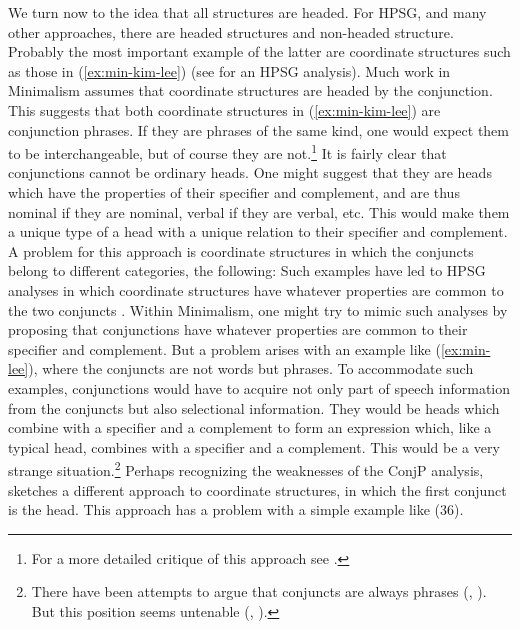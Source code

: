 \documentclass[output=paper]{langsci/langscibook}
\begin{document}
We turn now to the idea that all structures are headed. For HPSG, and many other approaches, there are headed structures and non-headed structure. Probably the most important example of the latter are coordinate structures such as those in (\ref{ex:min-kim-lee}) (see \citealt{Sag.2003} for an HPSG analysis).
\label{ex:min-kim-lee}
\z
Much work in Minimalism assumes that coordinate structures are headed by the conjunction. This suggests that both coordinate structures in (\ref{ex:min-kim-lee}) are conjunction phrases. If they are phrases of the same kind, one would expect them to be interchangeable, but of course they are not.\footnote{%
	For a more detailed critique of this approach see \citet{Borsley2005a}.%
}
\label{ex:min-sang-dance}
\z
It is fairly clear that conjunctions cannot be ordinary heads. One might suggest that they are heads which have the properties of their specifier and complement, and are thus nominal if they are nominal, verbal if they are verbal, etc. This would make them a unique type of a head with a unique relation to their specifier and complement. A problem for this approach is coordinate structures in which the conjuncts belong to different categories, \eg the following:
\eal
{}\label{ex:min-hobbs-linguist}
\label{ex:min-hobbs-angry}
\zl 
Such examples have led to HPSG analyses in which coordinate structures have whatever properties are common to the two conjuncts \citep{Sag.2003}. Within Minimalism, one might try to mimic such analyses by proposing that conjunctions have whatever properties are common to their specifier and complement. But a problem arises with an example like (\ref{ex:min-lee}), where the conjuncts are not words but phrases.
\label{ex:min-kim-criticized}
\z
To accommodate such examples, conjunctions would have to acquire not only part of speech information from the conjuncts but also selectional information. They would be heads which combine with a specifier and a complement to form an expression which, like a typical head, combines with a specifier and a complement. This would be a very strange situation.\footnote{%
	There have been attempts to argue that conjuncts are always phrases (\citealt{Kayne94a-u}, \citealt{Bruening2018a}). But this position seems untenable (\citealt{Abeille2006a}, \citealt{MuellerLexicalism}).%
}
Perhaps recognizing the weaknesses of the ConjP analysis, \citet{Chomsky2013a} sketches a different approach to coordinate structures, in which the first conjunct is the head. This approach has a problem with a simple example like (36).
\end{document}
